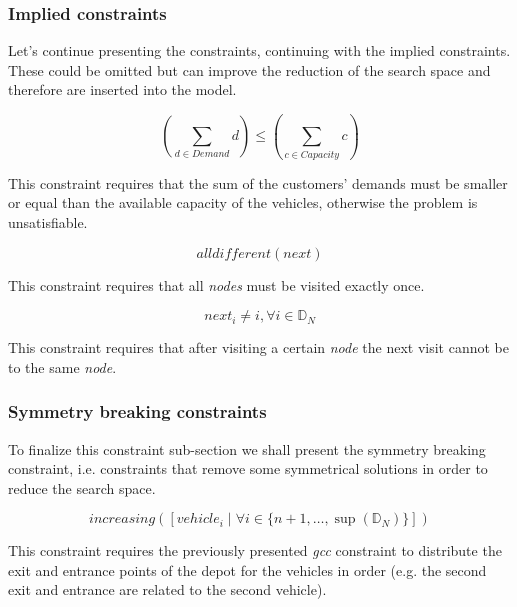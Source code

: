 \documentclass[../main.tex]{subfiles}
\begin{document}
\subsubsection{Implied constraints}
Let's continue presenting the constraints, continuing with the implied constraints. These could be omitted but can improve the reduction of the search space and therefore are inserted into the model.\\
\begin{center}
    \begin{equation}
        (\sum_{d \in Demand}{d}) \leq (\sum_{c \in Capacity}{c})
    \end{equation}
\end{center}
This constraint requires that the sum of the customers' demands must be smaller or equal than the available capacity of the vehicles, otherwise the problem is unsatisfiable.

\begin{center}
    \begin{equation}
        alldifferent(next)
    \end{equation}
\end{center}
This constraint requires that all \textit{nodes} must be visited exactly once.

\begin{center}
    \begin{equation}
        next_i \neq i, \forall i \in \mathbb{D}_N
    \end{equation}
\end{center}
This constraint requires that after visiting a certain \textit{node} the next visit cannot be to the same \textit{node}.

\subsubsection{Symmetry breaking constraints}
To finalize this constraint sub-section we shall present the symmetry breaking constraint, i.e. constraints that remove some symmetrical solutions in order to reduce the search space.
\begin{center}
    \begin{equation}
        increasing([vehicle_i \; | \; \forall i \in \{n+1,\dots,\sup{}(\mathbb{D}_N)\}])
    \end{equation}
\end{center}
This constraint requires the previously presented \textit{gcc} constraint to distribute the exit and entrance points of the depot for the vehicles in order (e.g. the second exit and entrance are related to the second vehicle).
\end{document}
